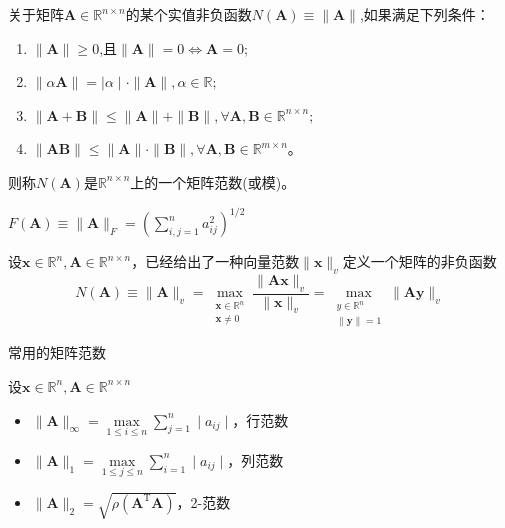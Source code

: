 \begin{definition}[矩阵范数]
    关于矩阵$\boldsymbol{A}\in\mathbb{R}^{n\times n}$的某个实值非负函数$N(\boldsymbol{A})\equiv\parallel \boldsymbol{A}\parallel$,如果满足下列条件：
    \begin{enumerate}
        \item $\parallel \boldsymbol{A}\parallel \geq 0$,且$\parallel \boldsymbol{A}\parallel=0\Leftrightarrow \boldsymbol{A}=0;$
        \item $\parallel \alpha \boldsymbol{A}\parallel = \mid \alpha \mid \cdot \parallel \boldsymbol{A}\parallel , \alpha \in \mathbb{R} ;$
        \item $\parallel \boldsymbol{A}+ \boldsymbol{B}\parallel \leq \parallel \boldsymbol{A}\parallel + \parallel \boldsymbol{B}\parallel , \forall \boldsymbol{A}, \boldsymbol{B}\in \mathbb{R} ^{n\times n};$
        \item $\parallel \boldsymbol{A}\boldsymbol{B}\parallel \leq \parallel \boldsymbol{A}\parallel \cdot \parallel \boldsymbol{B}\parallel , \forall \boldsymbol{A}, \boldsymbol{B}\in \mathbb{R} ^{m\times n}$。
    \end{enumerate}
则称$N(\boldsymbol{A})$是$\mathbb{R}^{n\times n}$上的一个矩阵范数(或模)。
\end{definition}
\begin{definition}[矩阵的F范数]
    $F(\boldsymbol{A})\equiv\|\boldsymbol{A}\|_{F} = \left( \sum\limits_{i,j = 1}^{n}a_{ij}^2 \right)^{1/2}$
\end{definition}
\begin{definition}[矩阵的算子范数]
    设$\boldsymbol{x}\in\mathbb{R}^n,\boldsymbol{A}\in\mathbb{R}^{n\times n}$，已经给出了一种向量范数$\|\boldsymbol{x}\|_{v}$定义一个矩阵的非负函数
    \[
        N(\boldsymbol{A})\equiv\parallel \boldsymbol{A}\parallel_{v}=\max_{\substack{\boldsymbol{x}\in\mathbb{R}^{n}\\\boldsymbol{x}\neq0}}\frac{\parallel \boldsymbol{A}\boldsymbol{x}\parallel_{v}}{\parallel \boldsymbol{x}\parallel_{v}}=\max_{\substack{y\in\mathbb{R}^{n}\\\parallel \boldsymbol{y}\parallel=1}}\parallel \boldsymbol{Ay}\parallel_{v}
    \]
\end{definition}
\begin{note}
    常用的矩阵范数
    
    设$\boldsymbol{x}\in\mathbb{R}^n,\boldsymbol{A}\in\mathbb{R}^{n\times n}$
    \begin{itemize}
        \item $\parallel \boldsymbol{A}\parallel_{\infty}=\max\limits_{1\leq i\leq n}\sum_{j=1}^{n}\mid a_{ij}\mid$，行范数
        \item $\parallel \boldsymbol{A}\parallel_1=\max\limits_{1\leq j\leq n}\sum_{i=1}^n\mid a_{ij}\mid$，列范数
        \item $\parallel \boldsymbol{A}\parallel_2=\sqrt{\rho(\boldsymbol{A}^\mathrm{T}\boldsymbol{A})}$，2-范数
    \end{itemize}
\end{note}
